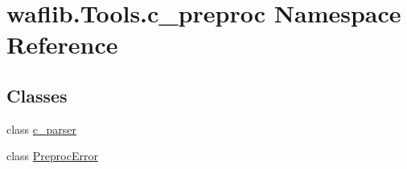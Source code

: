 \hypertarget{namespacewaflib_1_1_tools_1_1c__preproc}{}\section{waflib.\+Tools.\+c\+\_\+preproc Namespace Reference}
\label{namespacewaflib_1_1_tools_1_1c__preproc}
\subsection*{Classes}
\begin{DoxyCompactItemize}
\item 
class \hyperlink{classwaflib_1_1_tools_1_1c__preproc_1_1c__parser}{c\+\_\+parser}
\item 
class \hyperlink{classwaflib_1_1_tools_1_1c__preproc_1_1_preproc_error}{Preproc\+Error}
\end{DoxyCompactItemize}
